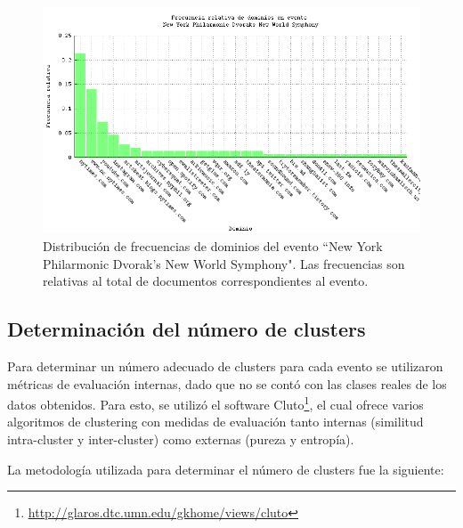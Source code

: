 \begin{figure}[h]
  \centering
  \includegraphics[width=14cm]{./img/dvorak-domain-freqs.png}
  \caption[Dominios evento 4]
   {Distribución de frecuencias de dominios del evento ``New York
  Philarmonic Dvorak's New World Symphony"\label{fig:dvorak-domains}. Las frecuencias son relativas al total de
  documentos correspondientes al evento.}
\end{figure}

\subsection{Determinación del número de clusters}
\label{sec-4.4.2}


Para determinar un número adecuado de clusters para cada evento se
utilizaron métricas de evaluación internas, dado que no se contó con
las clases reales de los datos obtenidos. Para esto, se utilizó el
software Cluto\footnote{\href{http://glaros.dtc.umn.edu/gkhome/views/cluto}{http://glaros.dtc.umn.edu/gkhome/views/cluto} }, el
cual ofrece varios algoritmos de clustering con medidas de evaluación
tanto internas (similitud intra-cluster y inter-cluster) como externas
(pureza y entropía).

La metodología utilizada para determinar el número de clusters fue la
siguiente:

